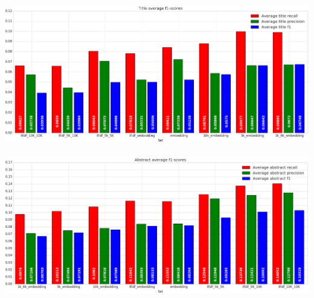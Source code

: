 \documentclass[../../Thesis.tex]{subfiles}
\begin{document}
\includegraphics[width=6in]{Plots/Title_avg_f1}\\
\\
\includegraphics[width=6in]{Plots/Abstract_avg_f1}\\
\\
\end{document}
